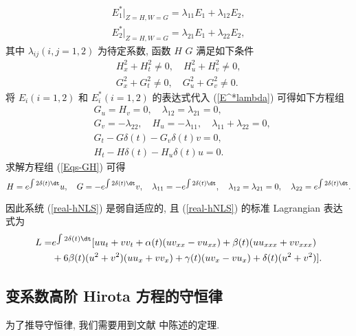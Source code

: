 \begin{equation}\label{E^*lambda}
\begin{aligned}
E_1^*|_{Z=H,W=G}=\lambda_{11}E_1 +\lambda_{12}E_2,\\
E_2^*|_{Z=H,W=G}=\lambda_{21}E_1 +\lambda_{22}E_2,
\end{aligned}
\end{equation}
其中 $\lambda_{ij}(i, j = 1,2)$ 为待定系数, 函数 $H$  $G$ 满足如下条件
\begin{equation}
\begin{aligned}
H_x^2+H_t^2\neq 0,\quad H_u^2+H_v^2\neq 0,\\
G_x^2+G_t^2\neq 0,\quad G_u^2+G_v^2\neq 0.
\end{aligned}
\end{equation}
将 $E_i(i = 1,2)$ 和 $E_i^*(i = 1, 2)$ 的表达式代入 (\ref{E^*lambda}) 可得如下方程组
\begin{equation}\label{Eqs-GH}
\begin{aligned}
&G_u=H_v=0,\quad \lambda_{12}=\lambda_{21}=0,\\
&G_v=-\lambda_{22},\quad H_u=-\lambda_{11},\quad \lambda_{11}+\lambda_{22}=0,\\
&G_t-G\delta(t)-G_v\delta(t)v=0,\\
&H_t-H\delta(t)-H_u\delta(t)u=0.
\end{aligned}
\end{equation}
求解方程组 (\ref{Eqs-GH}) 可得
\begin{equation}
H=e^{\int 2\delta(t)\dt} u, \quad G=-e^{\int 2\delta(t)\dt}v, \quad \lambda_{11}=-e^{\int 2\delta(t)\dt},\quad \lambda_{12}=\lambda_{21}=0,\quad  \lambda_{22}=e^{\int 2\delta(t)\dt}.
\end{equation}

因此系统 (\ref{real-hNLS}) 是弱自适应的, 且 (\ref{real-hNLS}) 的标准 Lagrangian 表达式为
\begin{equation}
\begin{aligned}
L=&e^{\int 2\delta(t)\dt}[uu_t+vv_t+\alpha(t)(uv_{xx}-vu_{xx})+\beta(t)(uu_{xxx}+vv_{xxx})\\
&+6\beta(t) (u^2+v^2)(uu_x+vv_x)+\gamma(t)(uv_x-vu_x)+\delta(t)(u^2+v^2)].
\end{aligned}
\end{equation}
\subsection{变系数高阶 Hirota 方程的守恒律}
为了推导守恒律, 我们需要用到文献 \cite{INH06} 中陈述的定理.

